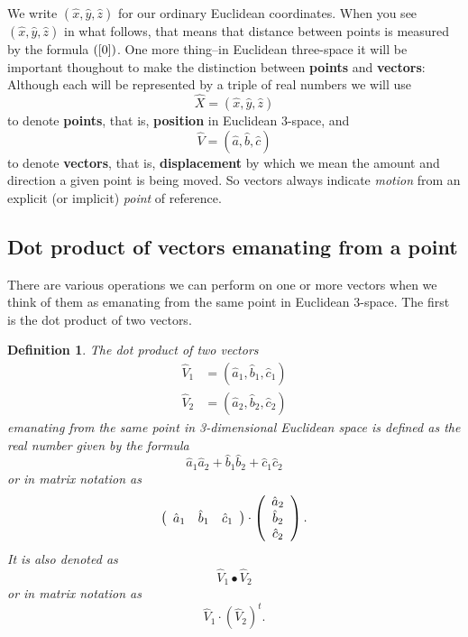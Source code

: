 \documentclass{article}%
\newtheorem{definition}[theorem]{Definition}
\begin{document}
We write $\left(  \hat{x},\hat{y},\hat{z}\right)  $ for our ordinary Euclidean
coordinates. When you see $\left(  \hat{x},\hat{y},\hat{z}\right)  $ in what
follows, that means that distance between points is measured by the formula
$\left(  \ref{0}\right)  $. One more thing--in Euclidean three-space it will
be important thoughout to make the distinction between \textbf{points} and
\textbf{vectors}: Although each will be represented by a triple of real
numbers we will use%
\[
\hat{X}=\left(  \hat{x},\hat{y},\hat{z}\right)
\]
to denote \textbf{points}, that is, \textbf{position} in Euclidean $3$-space,
and%
\[
\hat{V}=\left(  \hat{a},\hat{b},\hat{c}\right)
\]
to denote \textbf{vectors}, that is, \textbf{displacement} by which we mean
the amount and direction a given point is being moved. So vectors always
indicate \textit{motion} from an explicit (or implicit) \textit{point} of
reference. \newpage

\subsection{Dot product of vectors emanating from a point}

There are various operations we can perform on one or more vectors when we
think of them as emanating from the same point in Euclidean $3$-space. The
first is the dot product of two vectors.

\begin{definition}
The dot product of two vectors%
\begin{align*}
\hat{V}_{1}  &  =\left(  \hat{a}_{1},\hat{b}_{1},\hat{c}_{1}\right) \\
\hat{V}_{2}  &  =\left(  \hat{a}_{2},\hat{b}_{2},\hat{c}_{2}\right)
\end{align*}
\newline emanating from the same point in 3-dimensional Euclidean space is
defined as the real number given by the formula%
\[
\hat{a}_{1}\hat{a}_{2}+\hat{b}_{1}\hat{b}_{2}+\hat{c}_{1}\hat{c}_{2}%
\]
or in matrix notation as%
\[
\left(
\begin{array}
[c]{ccc}%
\hat{a}_{1} & \hat{b}_{1} & \hat{c}_{1}%
\end{array}
\right)  \cdot\left(
\begin{array}
[c]{c}%
\hat{a}_{2}\\
\hat{b}_{2}\\
\hat{c}_{2}%
\end{array}
\right)  .
\]
It is also denoted as%
\[
\hat{V}_{1}\bullet\hat{V}_{2}%
\]
or in matrix notation as%
\[
\hat{V}_{1}\cdot\left(  \hat{V}_{2}\right)  ^{t}.
\]

\end{definition}
\end{document}
